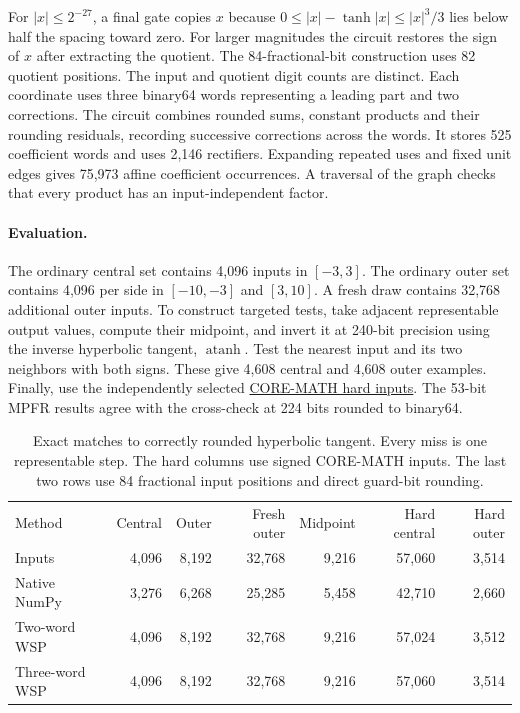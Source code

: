 For $|x|\le 2^{-27}$, a final gate copies $x$ because $0\le |x|-\tanh|x|\le |x|^3/3$ lies below half the spacing toward zero. For larger magnitudes the circuit restores the sign of $x$ after extracting the quotient. The 84-fractional-bit construction uses 82 quotient positions. The input and quotient digit counts are distinct. Each coordinate uses three binary64 words representing a leading part and two corrections. The circuit combines rounded sums, constant products and their rounding residuals, recording successive corrections across the words. It stores 525 coefficient words and uses 2,146 rectifiers. Expanding repeated uses and fixed unit edges gives 75,973 affine coefficient occurrences. A traversal of the graph checks that every product has an input-independent factor.

\paragraph{Evaluation.}
The ordinary central set contains 4,096 inputs in $[-3,3]$. The ordinary outer set contains 4,096 per side in $[-10,-3]$ and $[3,10]$. A fresh draw contains 32,768 additional outer inputs. To construct targeted tests, take adjacent representable output values, compute their midpoint, and invert it at 240-bit precision using the inverse hyperbolic tangent, $\operatorname{atanh}$. Test the nearest input and its two neighbors with both signs. These give 4,608 central and 4,608 outer examples. Finally, use the independently selected \href{https://core-math.gitlabpages.inria.fr/worst.html}{CORE-MATH hard inputs}. The 53-bit MPFR results agree with the cross-check at 224 bits rounded to binary64.

\begin{table}[htbp]
\centering\small
\caption{Exact matches to correctly rounded hyperbolic tangent. Every miss is one representable step. The hard columns use signed CORE-MATH inputs. The last two rows use 84 fractional input positions and direct guard-bit rounding.}
\label{tab:relu-tanh}
\begin{tabular}{@{}lrrrrrr@{}}\toprule
Method & Central & Outer & Fresh outer & Midpoint & Hard central & Hard outer\\
Inputs & 4,096 & 8,192 & 32,768 & 9,216 & 57,060 & 3,514\\\midrule
Native NumPy & 3,276 & 6,268 & 25,285 & 5,458 & 42,710 & 2,660\\
Two-word WSP & 4,096 & 8,192 & 32,768 & 9,216 & 57,024 & 3,512\\
Three-word WSP & 4,096 & 8,192 & 32,768 & 9,216 & 57,060 & 3,514\\\bottomrule
\end{tabular}
\end{table}


